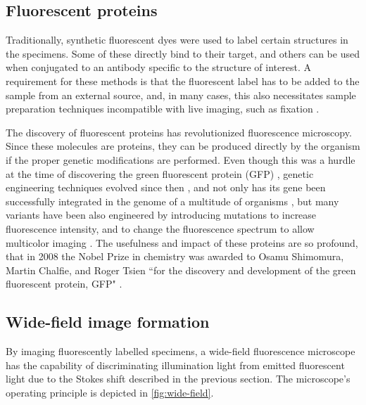 

  \subsection{Fluorescent proteins}
    Traditionally, synthetic fluorescent dyes were used to label certain structures in the specimens. Some of these directly bind to their target,
    and others can be used when conjugated to an antibody specific to the structure of interest. A requirement for these methods is that the fluorescent label has to be added to the sample from an external source, and, in many cases, this also necessitates sample preparation techniques incompatible with live imaging, such as fixation \cite{bacallao_guiding_1990}.

    The discovery of fluorescent proteins has revolutionized fluorescence microscopy. Since these molecules are proteins, they can be produced directly by the organism if the proper genetic modifications are performed. Even though this was a hurdle at the time of discovering the green fluorescent protein (GFP) \cite{shimomura_extraction_1962}, genetic engineering techniques evolved since then \cite{prasher_primary_1992}, and not only has its gene been successfully integrated in the genome of a multitude of organisms \cite{chalfie_green_1994,amsterdam_aequorea_1995,okabe_green_1997}, but many variants have been also engineered by introducing mutations to increase fluorescence intensity, and to change the fluorescence spectrum to allow multicolor imaging \cite{heim_wavelength_1994,heim_engineering_1996,cormack_facs-optimized_1996,okabe_green_1997}. The usefulness and impact of these proteins are so profound, that in 2008 the Nobel Prize in chemistry was awarded to Osamu Shimomura, Martin Chalfie, and Roger Tsien ``for the discovery and development of the green fluorescent protein, GFP" \cite{service_three_2008}.


  \subsection{Wide-field image formation}
    By imaging fluorescently labelled specimens, a wide-field fluorescence microscope has the capability of discriminating illumination light from emitted fluorescent light due to the Stokes shift described in the previous section. The microscope's operating principle is depicted in \autoref{fig:wide-field}.

